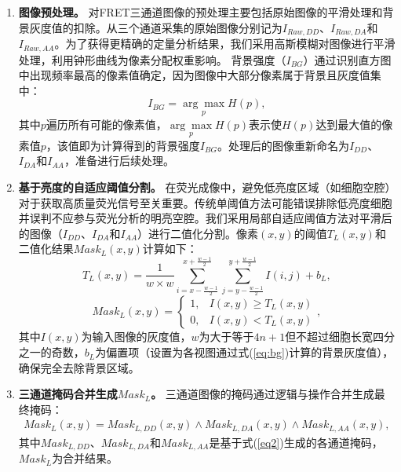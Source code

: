 \begin{enumerate}
\item \textbf{图像预处理。}  
对FRET三通道图像的预处理主要包括原始图像的平滑处理和背景灰度值的扣除。从三个通道采集的原始图像分别记为$I_{Raw,DD}$、$I_{Raw,DA}$和$I_{Raw,AA}$。为了获得更精确的定量分析结果，我们采用高斯模糊对图像进行平滑处理，利用钟形曲线为像素分配权重影响。  
背景强度（$I_{BG}$）通过识别直方图中出现频率最高的像素值确定，因为图像中大部分像素属于背景且灰度值集中：
\begin{equation}
    I_{BG} = \underset{p}{\arg\max} H(p), 
    \label{eq:bg}
\end{equation}
其中$p$遍历所有可能的像素值，$\underset{p}{\arg\max} H(p)$表示使$H(p)$达到最大值的像素值$p$，该值即为计算得到的背景强度$I_{BG}$。处理后的图像重新命名为$I_{DD}$、$I_{DA}$和$I_{AA}$，准备进行后续处理。

\item \textbf{基于亮度的自适应阈值分割。}  
在荧光成像中，避免低亮度区域（如细胞空腔）对于获取高质量荧光信号至关重要。传统单阈值方法可能错误排除低亮度细胞并误判不应参与荧光分析的明亮空腔。我们采用局部自适应阈值方法对平滑后的图像（$I_{DD}$、$I_{DA}$和$I_{AA}$）进行二值化分割。像素$(x, y)$的阈值$T_L(x,y)$和二值化结果${Mask}_L(x,y)$计算如下：
\begin{equation}
    T_L(x,y)=\frac{1}{w \times w} \sum_{i=x-\frac{w-1}{2}}^{x+\frac{w-1}{2}} \sum_{j=y-\frac{w-1}{2}}^{y+\frac{w-1}{2}} I(i,j)+b_L,
    \label{eq1}
\end{equation}
\begin{equation}
    {Mask}_L(x,y)=\begin{cases}
        1,&I(x,y) \geq T_L(x,y) \\
        0,&I(x,y) < T_L(x,y)
    \end{cases},
    \label{eq2}
\end{equation}
其中$I(x,y)$为输入图像的灰度值，$w$为大于等于$4n+1$但不超过细胞长宽四分之一的奇数，$b_L$为偏置项（设置为各视图通过式(\ref{eq:bg})计算的背景灰度值），确保完全去除背景区域。

\item \textbf{三通道掩码合并生成${Mask}_L$。}  
三通道图像的掩码通过逻辑与操作合并生成最终掩码：
\begin{equation}
    \begin{split}
    {Mask}_L(x,y)={Mask}_{L,DD}(x,y) \land {Mask}_{L,DA}(x,y) \land {Mask}_{L,AA}(x,y),
    \end{split}
    \label{eq3}
\end{equation}
其中${Mask}_{L,DD}$、${Mask}_{L,DA}$和${Mask}_{L,AA}$是基于式(\ref{eq2})生成的各通道掩码，${Mask}_{L}$为合并结果。


\end{enumerate}

